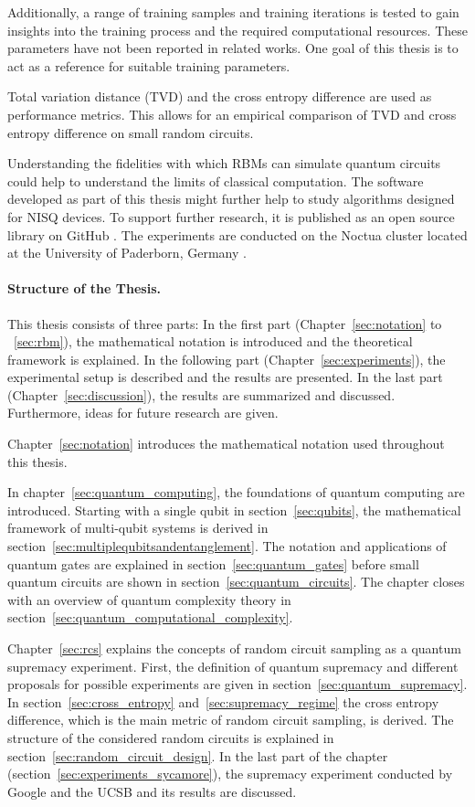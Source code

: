 Additionally, a range of training samples and training iterations 
is tested to gain insights into the training process and the required computational resources. 
These parameters have not been reported in related works. One goal of this thesis is 
to act as a reference for suitable training parameters. 

Total variation distance (TVD) and the cross entropy difference are used as 
performance metrics. This allows for an empirical comparison of TVD and cross entropy difference 
on small random circuits.

Understanding the
fidelities with which RBMs can simulate quantum circuits could help to understand
the limits of classical computation. The software developed as part of this thesis 
might further help to study algorithms designed for NISQ devices. To support 
further research, it is published as 
an open source library on GitHub \cite{NQS2020}.
The experiments are conducted on the Noctua cluster located at the 
University of Paderborn, Germany \cite{noctua2020}.

\paragraph{Structure of the Thesis.}
This thesis consists of three parts: 
In the first part (Chapter~\ref{sec:notation} to ~\ref{sec:rbm}), the mathematical 
notation is introduced and the theoretical framework is explained. In the 
following part (Chapter~\ref{sec:experiments}), 
the experimental setup is described and the results are presented. 
In the last part (Chapter~\ref{sec:discussion}), the results are summarized and discussed.
Furthermore, ideas for future research are given.

Chapter~\ref{sec:notation} introduces the mathematical notation used throughout this 
thesis.

In chapter~\ref{sec:quantum_computing}, the foundations of quantum computing are introduced. 
Starting with a single qubit in section~\ref{sec:qubits}, the mathematical framework of multi-qubit systems is derived
in section~\ref{sec:multiplequbitsandentanglement}. The notation and applications 
of quantum gates are explained in section~\ref{sec:quantum_gates} before small quantum circuits are shown
in section~\ref{sec:quantum_circuits}. The chapter closes with an overview of quantum complexity 
theory in section~\ref{sec:quantum_computational_complexity}.

Chapter~\ref{sec:rcs} explains the concepts of random circuit sampling as a quantum supremacy experiment.
First, the definition of quantum supremacy and different proposals for possible experiments 
are given in section~\ref{sec:quantum_supremacy}. 
In section~\ref{sec:cross_entropy} and~\ref{sec:supremacy_regime} the 
cross entropy difference, which is the main metric of random circuit sampling, is derived.
The structure of the considered random circuits is explained in section~\ref{sec:random_circuit_design}.
In the last part of the chapter (section~\ref{sec:experiments_sycamore}), the supremacy experiment conducted by Google and the UCSB 
and its results are discussed.

